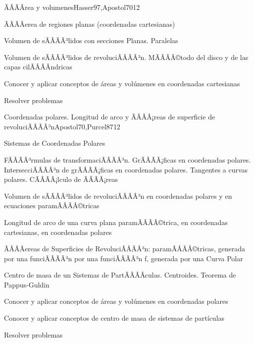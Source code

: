 \begin{sumilla}
\begin{unit}{ÃÂÃÂrea y volumenes}{Hasser97,Apostol70}{12}
\begin{topicos}
      \item ÃÂÃÂerea de regiones planas (coordenadas cartesianas)
      \item Volumen de sÃÂÃÂ³lidos con secciones Planas. Paralelas
      \item Volumen de sÃÂÃÂ³lidos de revoluciÃÂÃÂ³n. MÃÂÃÂ©todo del disco y de las capas cilÃÂÃÂ­ndricas
\end{topicos}

\begin{objetivos}
	\item Conocer y aplicar conceptos de \'areas y vol\'umenes en coordenadas cartesianas
	\item Resolver problemas
\end{objetivos}
\end{unit}

\begin{unit}{Coordenadas polares. Longitud de arco y ÃÂÃÂ¡reas de superficie de revoluciÃÂÃÂ³n}{Apostol70,Purcel87}{12}
\begin{topicos}
	\item Sistemas de Coordenadas Polares
	\item FÃÂÃÂ³rmulas de transformaciÃÂÃÂ³n. GrÃÂÃÂ¡ficas en coordenadas polares. IntersecciÃÂÃÂ³n de grÃÂÃÂ¡ficas en coordenadas polares. Tangentes a curvas polares. CÃÂÃÂ¡lculo de ÃÂÃÂ¡reas
	\item Volumen de sÃÂÃÂ³lidos de revoluciÃÂÃÂ³n en coordenadas polares y en ecuaciones paramÃÂÃÂ©tricas
	\item Longitud de arco de una curva plana paramÃÂÃÂ©trica, en coordenadas cartesianas, en  coordenadas polares
	\item ÃÂÃÂereas de Superficies de RevoluciÃÂÃÂ³n: paramÃÂÃÂ©tricas,  generada por una funciÃÂÃÂ³n por una  funciÃÂÃÂ³n f, generada por una Curva  Polar
	\item Centro de masa de un Sistemas de PartÃÂÃÂ­culas. Centroides. Teorema de Pappus-Guldin
\end{topicos}

\begin{objetivos}
	\item Conocer y aplicar conceptos de \'areas y vol\'umenes en coordenadas polares
	\item Conocer y aplicar conceptos de centro de masa de sistemas de part\'iculas
	\item Resolver problemas
\end{objetivos}
\end{unit}


\end{sumilla}
